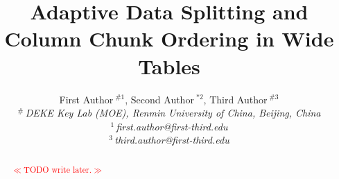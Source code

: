 \documentclass[10pt,conference,letterpaper]{IEEEtran}
\title{Adaptive Data Splitting and Column Chunk Ordering in Wide Tables}
\author{%
{First Author{\small $~^{\#1}$}, Second Author{\small $~^{*2}$}, Third Author{\small $~^{\#3}$} }%
\vspace{1.6mm}\\
\fontsize{10}{10}\selectfont\itshape
$^{\#}$\,DEKE Key Lab (MOE), Renmin University of China, Beijing, China\\
\fontsize{9}{9}\selectfont\ttfamily\upshape
%
$^{1}$\,first.author@first-third.edu\\
$^{3}$\,third.author@first-third.edu%
}
\newcommand{\todo}[1]{{\footnotesize \textcolor{red}{$\ll$\textsf{TODO #1}$\gg$}}}
\begin{document}
\maketitle
%
\begin{abstract} 
\todo{write later.}
\end{abstract}


%





















% 
\end{document}
